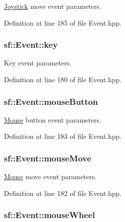 \hyperlink{classsf_1_1_joystick}{Joystick} move event parameters. 



Definition at line 185 of file Event.\-hpp.

\hypertarget{classsf_1_1_event_a45b92fc6757ca7c193f06b302e424ab0}{
\subsubsection[{key}]{ sf\-::\-Event\-::key}}\label{classsf_1_1_event_a45b92fc6757ca7c193f06b302e424ab0}


Key event parameters. 



Definition at line 180 of file Event.\-hpp.

\hypertarget{classsf_1_1_event_a20886a16ab7624de070b97145bb1dcac}{
\subsubsection[{mouse\-Button}]{ sf\-::\-Event\-::mouse\-Button}}\label{classsf_1_1_event_a20886a16ab7624de070b97145bb1dcac}


\hyperlink{classsf_1_1_mouse}{Mouse} button event parameters. 



Definition at line 183 of file Event.\-hpp.

\hypertarget{classsf_1_1_event_a786620ec4315d40c7c4cf4ddf3a1881f}{
\subsubsection[{mouse\-Move}]{ sf\-::\-Event\-::mouse\-Move}}\label{classsf_1_1_event_a786620ec4315d40c7c4cf4ddf3a1881f}


\hyperlink{classsf_1_1_mouse}{Mouse} move event parameters. 



Definition at line 182 of file Event.\-hpp.

\hypertarget{classsf_1_1_event_a8758c6d7998757978fd9146099a02a1e}{
\subsubsection[{mouse\-Wheel}]{ sf\-::\-Event\-::mouse\-Wheel}}\label{classsf_1_1_event_a8758c6d7998757978fd9146099a02a1e}



